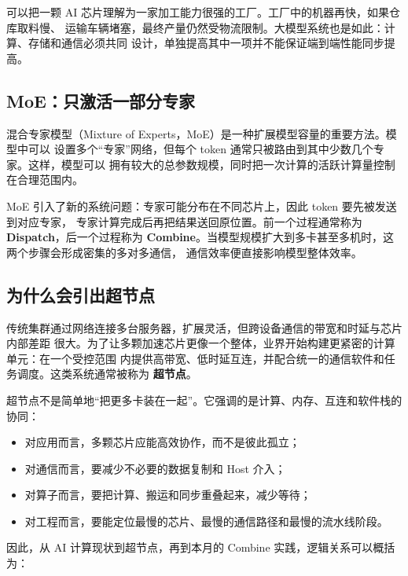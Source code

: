 \documentclass[UTF8,a4paper,11pt]{ctexart}
\newcommand{\term}[1]{\textbf{#1}}
\begin{document}
可以把一颗 AI 芯片理解为一家加工能力很强的工厂。工厂中的机器再快，如果仓库取料慢、
运输车辆堵塞，最终产量仍然受物流限制。大模型系统也是如此：计算、存储和通信必须共同
设计，单独提高其中一项并不能保证端到端性能同步提高。

\subsection{MoE：只激活一部分专家}

混合专家模型（Mixture of Experts，MoE）是一种扩展模型容量的重要方法。模型中可以
设置多个“专家”网络，但每个 token 通常只被路由到其中少数几个专家。这样，模型可以
拥有较大的总参数规模，同时把一次计算的活跃计算量控制在合理范围内\cite{shazeer2017moe,fedus2021switch}。

MoE 引入了新的系统问题：专家可能分布在不同芯片上，因此 token 要先被发送到对应专家，
专家计算完成后再把结果送回原位置。前一个过程通常称为 \term{Dispatch}，后一个过程称为
\term{Combine}。当模型规模扩大到多卡甚至多机时，这两个步骤会形成密集的多对多通信，
通信效率便直接影响模型整体效率。

\subsection{为什么会引出超节点}

传统集群通过网络连接多台服务器，扩展灵活，但跨设备通信的带宽和时延与芯片内部差距
很大。为了让多颗加速芯片更像一个整体，业界开始构建更紧密的计算单元：在一个受控范围
内提供高带宽、低时延互连，并配合统一的通信软件和任务调度。这类系统通常被称为
\term{超节点}。

超节点不是简单地“把更多卡装在一起”。它强调的是计算、内存、互连和软件栈的协同：

\begin{itemize}
  \item 对应用而言，多颗芯片应能高效协作，而不是彼此孤立；
  \item 对通信而言，要减少不必要的数据复制和 Host 介入；
  \item 对算子而言，要把计算、搬运和同步重叠起来，减少等待；
  \item 对工程而言，要能定位最慢的芯片、最慢的通信路径和最慢的流水线阶段。
\end{itemize}

因此，从 AI 计算现状到超节点，再到本月的 Combine 实践，逻辑关系可以概括为：
\end{document}
